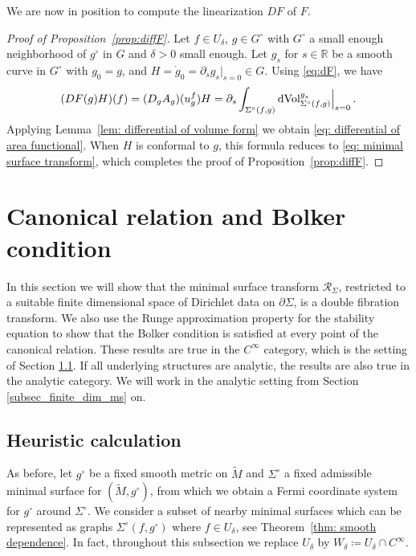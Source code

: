 \documentclass[11pt]{amsart}
\theoremstyle{definition}
\numberwithin{equation}{section}
\newcommand{\p}{\partial}
\begin{document}
We are now in position to compute the linearization $DF$ of $F$. 
\begin{proof}[Proof of  Proposition~\ref{prop:diffF}]
Let $f\in U_\delta$, $g\in G^\circ$ with $G^\circ$ a small enough neighborhood of $g^\circ$ in $G$ and $\delta>0$ small enough. Let $g_s$ for $s \in\mathbb R$ be a smooth curve in $G^\circ$ with $g_ 0 = g$, and $H= \dot{g}_0 = \partial_s g_s\vert_{s=0}\in G$. Using \eqref{eq:dF}, we have
\begin{eqnarray}\nonumber
(DF(g)H)(f) = (D_{g}A_{g})(u_{g}^f)H  = \p_s \int_{\Sigma^\circ(f,g)} %
{\rm dVol}^{g_s}_{\Sigma^\circ(f,g)} \Big|_{s=0}\,.
\end{eqnarray}
Applying Lemma~\ref{lem: differential of volume form} we obtain \eqref{eq: differential of area functional}. When $H$ is conformal to $g$, this formula reduces to \eqref{eq: minimal surface transform}, which completes the proof of Proposition~\ref{prop:diffF}.
\end{proof}









\section{Canonical relation and Bolker condition} \label{sec_bolker}

In this section we will show that the minimal surface transform $\mathcal{R}_{\Sigma}$, restricted to a suitable finite dimensional space of Dirichlet data on $\p \Sigma$, is a double fibration transform. We also use the Runge approximation property for the stability equation to show that the Bolker condition is satisfied at every point of the canonical relation. These results are true in the $C^{\infty}$ category, which is the setting of Section \ref{subsect: heuristic}. If all underlying structures are analytic, the results are also true in the analytic category. We will work in the analytic setting from Section \ref{subsec_finite_dim_ms} on.

\subsection{Heuristic calculation}\label{subsect: heuristic}
As before, let $g^\circ$ be a fixed smooth metric on $\widetilde{M}$ and $\Sigma^\circ$ a fixed admissible minimal surface for $(\widetilde{M},g^\circ)$, from which we obtain a Fermi coordinate system for $g^\circ$ around $\Sigma^\circ$. We consider a subset of nearby minimal surfaces which can be represented as graphs $\Sigma^\circ(f,g^\circ)$ where $f\in U_\delta$, see Theorem~\ref{thm: smooth dependence}. %
In fact, throughout this subsection we replace $U_\delta$ by $W_\delta \coloneqq U_{\delta}\cap C^\infty$.
\end{document}
